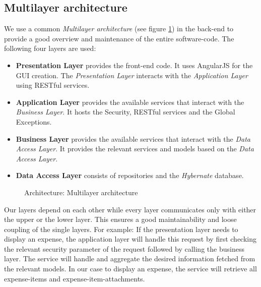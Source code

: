 \subsection{Multilayer architecture}
We use a common \textit{Multilayer architecture} (see figure \ref{fig:architecture-layer}) in the back-end to provide a good overview and maintenance of the entire software-code. The following four layers are used:
\begin{itemize}
    \item \textbf{Presentation Layer} provides the front-end code. It uses AngularJS for the GUI creation. The \textit{Presentation Layer} interacts with the \textit{Application Layer} using RESTful services.
    \item \textbf{Application Layer} provides the available services that interact with the \textit{Business Layer}. It hosts the Security, RESTful services and the Global Exceptions.
    \item \textbf{Business Layer} provides the available services that interact with the \textit{Data Access Layer}. It provides the relevant services and models based on the \textit{Data Access Layer}.
    \item \textbf{Data Access Layer} consists of repositories and the \textit{Hybernate} database.
\end{itemize}

\begin{figure}[H]
    \centering
    \caption{Architecture: Multilayer architecture}
    \label{fig:architecture-layer}
\end{figure}

Our layers depend on each other while every layer communicates only with either the upper or the lower layer. This ensures a good maintainability and loose coupling of the single layers.\newline
For example: If the presentation layer needs to display an expense, the application layer will handle this request by first checking the relevant security parameter of the request followed by calling the business layer. The service will handle and aggregate the desired information fetched from the relevant models. In our case to display an expense, the service will retrieve all expense-items and expense-item-attachments.


